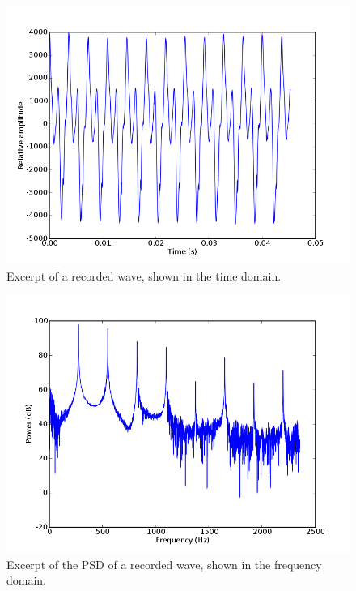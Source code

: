 \documentclass[twocolumn]{article}
\begin{document}
\begin{figure}
\centering
\includegraphics[width=\linewidth]{figures/time.png}
\caption{Excerpt of a recorded wave, shown in the time domain.}
\label{time}
\end{figure}

\begin{figure}
\centering
\includegraphics[width=\linewidth]{figures/psd.png}
\caption{Excerpt of the PSD of a recorded wave, shown in the frequency domain.}
\label{psd}
\end{figure}
\end{document}
